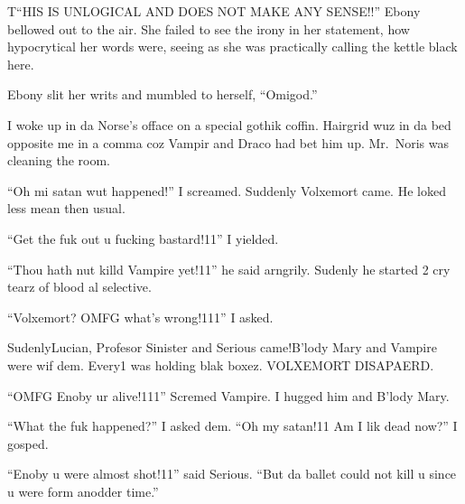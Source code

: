 \begin{sloppypar}
    T\enquote{HIS IS UNLOGICAL AND DOES NOT MAKE ANY SENSE!!} Ebony bellowed out to the air. She failed to see the irony in her statement, how hypocrytical her words were, seeing as she was practically calling the kettle black here.
\end{sloppypar}

Ebony slit her writs and mumbled to herself, \enquote{Omigod.}


\vspace{1em}




I woke up in da Norse's offace on a special gothik coffin. Hairgrid wuz in da bed opposite me in a comma coz Vampir and Draco had bet him up. Mr.~Noris was cleaning the room.

\enquote{Oh mi satan wut happened!} I screamed. Suddenly Volxemort came. He loked less mean then usual.

\enquote{Get the fuk out u fucking bastard!11} I yielded.

\enquote{Thou hath nut killd Vampire yet!11} he said arngrily. Sudenly he started 2 cry tearz of blood al selective.

\enquote{Volxemort? OMFG what's wrong!111} I asked.

Sudenly\dotfill Lucian, Profesor Sinister and Serious came!\newline B'lody Mary and Vampire were wif dem. Every1 was holding blak boxez. VOLXEMORT DISAPAERD\@.

\enquote{OMFG Enoby ur alive!111} Scremed Vampire. I hugged him and B'lody Mary.

\enquote{What the fuk happened?} I asked dem. \enquote{Oh my satan!11 Am I lik dead now?} I gosped.

\enquote{Enoby u were almost shot!11} said Serious. \enquote{But da ballet could not kill u since u were form anodder time.}

